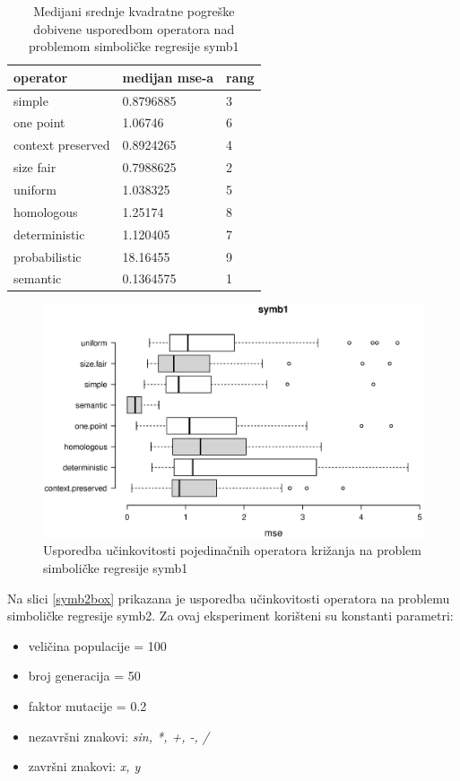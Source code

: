 \begin{table}[H]
 	\centering
 \caption{Medijani srednje kvadratne pogreške dobivene usporedbom operatora nad problemom simboličke regresije symb1}
    \begin{tabular}{| l | l | l |}
    \hline
    \textbf{operator} & \textbf{medijan mse-a} & \textbf{rang}\\ \hline
    simple & 0.8796885 & 3\\ \hline
    one point & 1.06746 & 6\\ \hline
    context preserved & 0.8924265 & 4\\ \hline
    size fair & 0.7988625 & 2\\ \hline
    uniform & 1.038325 & 5\\ \hline
    homologous & 1.25174 & 8\\ \hline
    deterministic & 1.120405 & 7\\ \hline
    probabilistic & 18.16455 & 9\\ \hline
    semantic & 0.1364575 & 1\\ \hline
    \end{tabular}
    
   
    \label{symb1table}
\end{table}

\begin{figure}[H]
	\centering
	\includegraphics[trim=0cm 4cm 0cm 0cm, scale=0.6]{./slike/boxPlots/symb1.eps}
	\caption{Usporedba učinkovitosti pojedinačnih operatora križanja na problem simboličke regresije symb1}
	\label{symb1box}
\end{figure}



Na slici \ref{symb2box} prikazana je usporedba učinkovitosti operatora na problemu simboličke regresije symb2. Za ovaj eksperiment korišteni su konstanti parametri:
\begin{itemize}
\item{veličina populacije = 100}
\item{broj generacija = 50}
\item{faktor mutacije = 0.2}
\item{nezavršni znakovi: \textit{sin, *, +, -, /}}
\item{završni znakovi: \textit{x, y}}
\end{itemize} 


